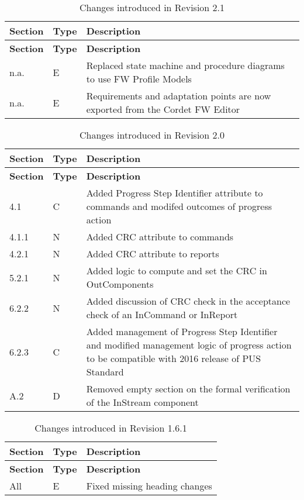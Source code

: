 \documentclass{pnp_article}
\begin{document}
\begin{longtable}{|p{1.5cm}|p{1cm}|p{8cm}|}
\caption{Changes introduced in Revision 2.1}  \\
\hline
\rowcolor{light-gray}
\textbf{Section} & \textbf{Type} & \textbf{Description} \\
\hline\hline
\endfirsthead
\rowcolor{light-gray}
\textbf{Section} & \textbf{Type} & \textbf{Description} \\
\hline\hline
\endhead
n.a. & E & Replaced state machine and procedure diagrams to use FW Profile Models \\
\hline
n.a. & E & Requirements and adaptation points are now exported from the Cordet FW Editor \\
\hline
\end{longtable}


\begin{longtable}{|p{1.5cm}|p{1cm}|p{8cm}|}
\caption{Changes introduced in Revision 2.0}  \\
\hline
\rowcolor{light-gray}
\textbf{Section} & \textbf{Type} & \textbf{Description} \\
\hline\hline
\endfirsthead
\rowcolor{light-gray}
\textbf{Section} & \textbf{Type} & \textbf{Description} \\
\hline\hline
\endhead
4.1 & C & Added Progress Step Identifier attribute to commands and modifed outcomes of progress action \\
\hline
4.1.1 & N & Added CRC attribute to commands \\
\hline
4.2.1 & N & Added CRC attribute to reports \\
\hline
5.2.1 & N & Added logic to compute and set the CRC in OutComponents \\
\hline
6.2.2 & N & Added discussion of CRC check in the acceptance check of an InCommand or InReport \\
\hline
6.2.3 & C & Added management of Progress Step Identifier and modified management logic of progress action to be compatible with 2016 release of PUS Standard \\
\hline
A.2 & D & Removed empty section on the formal verification of the InStream component \\
\hline
\end{longtable}


\begin{longtable}{|p{1.5cm}|p{1cm}|p{8cm}|}
\caption{Changes introduced in Revision 1.6.1}  \\
\hline
\rowcolor{light-gray}
\textbf{Section} & \textbf{Type} & \textbf{Description} \\
\hline\hline
\endfirsthead
\rowcolor{light-gray}
\textbf{Section} & \textbf{Type} & \textbf{Description} \\
\hline\hline
\endhead
All & E & Fixed missing heading changes \\
\hline
\end{longtable}
\end{document}
